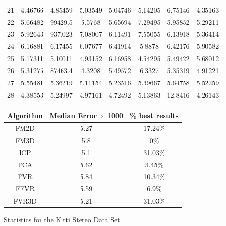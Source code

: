 \begin{figure}
\begin{tabular}{cccccccc}
21 & 4.46766 & 4.85459 & 5.03549 & 5.04746 & 5.14205 & 6.75146 & 4.35163\\
22 & 5.66482 & 99429.5 & 5.5768 & 5.65694 & 7.29495 & 5.95852 & 5.29211\\
23 & 5.92643 & 937.023 & 7.08007 & 6.11491 & 7.55055 & 6.13918 & 5.36414\\
24 & 6.16881 & 6.17455 & 6.07677 & 6.41914 & 5.8878 & 6.42176 & 5.90582\\
25 & 5.17311 & 5.10011 & 4.93152 & 6.16958 & 4.54295 & 5.49422 & 5.68012\\
26 & 5.31275 & 87463.4 & 4.3208 & 5.49572 & 6.3327 & 5.35319 & 4.91221\\
27 & 5.55481 & 5.36219 & 5.11154 & 5.23516 & 5.69667 & 5.64758 & 5.52259\\
28 & 4.38553 & 5.24997 & 4.97161 & 4.72492 & 5.13863 & 12.8416 & 4.26143\\
\end{tabular}
\vspace{10mm}
\centering
\begin{tabular}{ccc}
\hline
\textbf{Algorithm} & \textbf{Median Error $\times$ 1000} & \textbf{\% best results}\\ \hline
FM2D	& 5.27 & 17.24\%\\
FM3D	& 5.8 & 0\%\\
ICP	& 5.1 & 31.03\%\\
PCA	& 5.62 & 3.45\%\\
FVR	& 5.84 & 10.34\%\\
FFVR	& 5.59 & 6.9\%\\
FVR3D	& 5.21 & 31.03\%\\
\end{tabular}
\caption{Statistics for the Kitti Stereo Data Set}
\label{tab:kittistereo}
\end{figure} 




